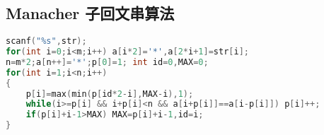 \subsection{Manacher 子回文串算法}
    \begin{lstlisting}[language=c++]
scanf("%s",str); 
for(int i=0;i<m;i++) a[i*2]='*',a[2*i+1]=str[i];
n=m*2;a[n++]='*';p[0]=1; int id=0,MAX=0;
for(int i=1;i<n;i++)
{
	p[i]=max(min(p[id*2-i],MAX-i),1);
	while(i>=p[i] && i+p[i]<n && a[i+p[i]]==a[i-p[i]]) p[i]++;
	if(p[i]+i-1>MAX) MAX=p[i]+i-1,id=i;
}
    \end{lstlisting}
